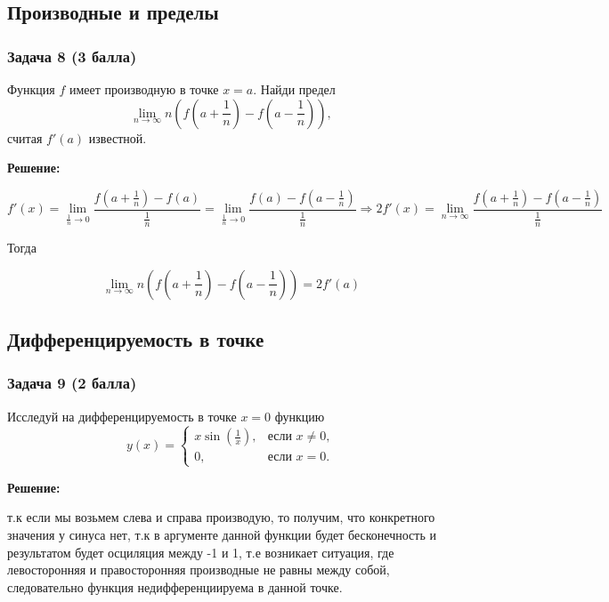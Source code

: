 \documentclass[a4paper,12pt]{article}
\begin{document}
\vspace{1cm}

\subsection{Производные и пределы}

\subsubsection{Задача 8 (3 балла)}
Функция \( f \) имеет производную в точке \( x = a \). Найди предел
\[
\lim_{n \to \infty} n \left( f\left(a + \frac{1}{n}\right) - f\left(a - \frac{1}{n}\right) \right),
\]
считая \( f'(a) \) известной. 

\textbf{Решение:}

\[
f'(x) = \lim_{\frac{1}{n} \to 0} \frac{f(a+\frac{1}{n}) - f(a)}{\frac{1}{n}} = \lim_{\frac{1}{n} \to 0} \frac{f(a) - f(a-\frac{1}{n})}{\frac{1}{n}} \Rightarrow  2f'(x) = \lim_{n \to \infty} \frac{f(a+\frac{1}{n}) - f(a-\frac{1}{n})}{\frac{1}{n}} 
\]

Тогда 

\[
\lim_{n \to \infty} n \left( f\left(a + \frac{1}{n}\right) - f\left(a - \frac{1}{n}\right) \right) = 2f'(a)
\]
\vspace{1cm}

\subsection{Дифференцируемость в точке}

\subsubsection{Задача 9 (2 балла)}
Исследуй на дифференцируемость в точке \( x = 0 \) функцию
\[
y(x) =
\begin{cases}
x \sin\left(\frac{1}{x}\right), & \text{если } x \neq 0, \\
0, & \text{если } x = 0.
\end{cases}
\]

\textbf{Решение:}

т.к если мы возьмем слева и справа производую, то получим, что конкретного значения у синуса нет, т.к в аргументе данной функции будет бесконечность и результатом будет осциляция между -1 и 1, т.е возникает ситуация, где левосторонняя и правосторонняя производные не равны между собой, следовательно функция недифференциируема в данной точке.
\end{document}
